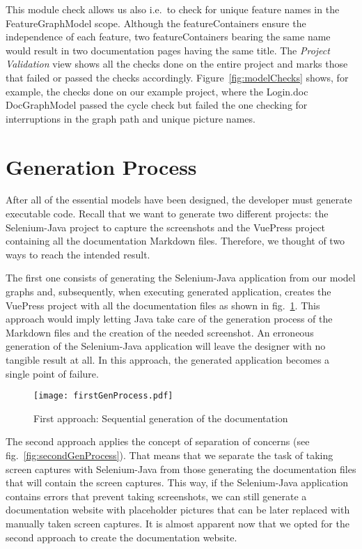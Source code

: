 This module check allows us also i.e.~to check for unique feature names in the FeatureGraphModel scope. Although the featureContainers ensure the independence of each feature, two featureContainers bearing the same name would result in two documentation pages having the same title. The \textit{Project Validation} view shows all the checks done on the entire project and marks those that failed or passed the checks accordingly. Figure~\ref{fig:modelChecks} shows, for example, the checks done on our example project, where the Login.doc DocGraphModel passed the cycle check but failed the one checking for interruptions in the graph path and unique picture names.

\section{Generation Process}\label{sec:GenProcess}

After all of the essential models have been designed, the developer must generate executable code. Recall that we want to generate two different projects: the Selenium-Java project to capture the screenshots and the VuePress project containing all the documentation Markdown files. Therefore, we thought of two ways to reach the intended result.

The first one consists of generating the Selenium-Java application from our model graphs and, subsequently, when executing generated application, creates the VuePress project with all the documentation files as shown in fig.~\ref{fig:firstGenProcess}. This approach would imply letting Java take care of the generation process of the Markdown files and the creation of the needed screenshot. An erroneous generation of the Selenium-Java application will leave the designer with no tangible result at all. In this approach, the generated application becomes a single point of failure.

\begin{figure}[h]
    \centering
    \texttt{[image: firstGenProcess.pdf]}
    \caption{First approach: Sequential generation of the documentation}
    \label{fig:firstGenProcess}
\end{figure}

The second approach applies the concept of separation of concerns (see fig.~\ref{fig:secondGenProcess}). That means that we separate the task of taking screen captures with Selenium-Java from those generating the documentation files that will contain the screen captures. This way, if the Selenium-Java application contains errors that prevent taking screenshots, we can still generate a documentation website with placeholder pictures that can be later replaced with manually taken screen captures. It is almost apparent now that we opted for the second approach to create the documentation website.

